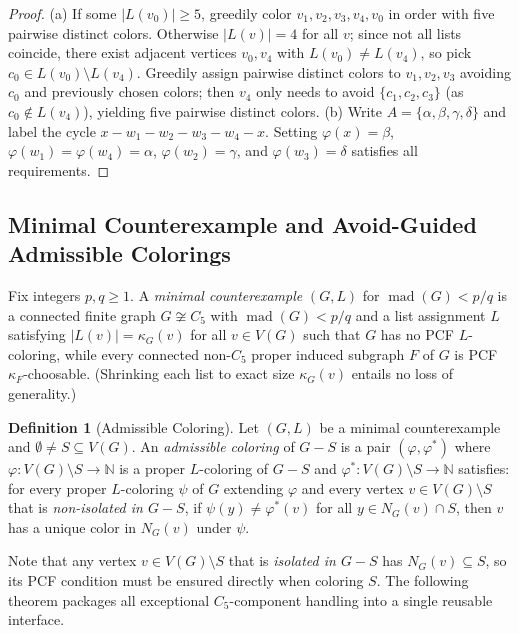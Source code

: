 \documentclass[11pt,a4paper]{article}
\theoremstyle{definition}
\newtheorem{definition}[theorem]{Definition}
\newcommand{\mad}{\operatorname{mad}}
\newcommand{\N}{\mathbb{N}}
\begin{document}
\begin{proof}
(a) If some $|L(v_0)| \ge 5$, greedily color $v_1, v_2, v_3, v_4, v_0$ in order with five pairwise distinct colors. Otherwise $|L(v)| = 4$ for all $v$; since not all lists coincide, there exist adjacent vertices $v_0, v_4$ with $L(v_0) \neq L(v_4)$, so pick $c_0 \in L(v_0) \setminus L(v_4)$. Greedily assign pairwise distinct colors to $v_1, v_2, v_3$ avoiding $c_0$ and previously chosen colors; then $v_4$ only needs to avoid $\{c_1, c_2, c_3\}$ (as $c_0 \notin L(v_4)$), yielding five pairwise distinct colors.
(b) Write $A = \{\alpha, \beta, \gamma, \delta\}$ and label the cycle $x - w_1 - w_2 - w_3 - w_4 - x$. Setting $\varphi(x) = \beta$, $\varphi(w_1) = \varphi(w_4) = \alpha$, $\varphi(w_2) = \gamma$, and $\varphi(w_3) = \delta$ satisfies all requirements.
\end{proof}

\subsection{Minimal Counterexample and Avoid-Guided Admissible Colorings}

Fix integers $p, q \ge 1$. A \emph{minimal counterexample} $(G, L)$ for $\mad(G) < p/q$ is a connected finite graph $G \not\cong C_5$ with $\mad(G) < p/q$ and a list assignment $L$ satisfying $|L(v)| = \kappa_G(v)$ for all $v \in V(G)$ such that $G$ has no PCF $L$-coloring, while every connected non-$C_5$ proper induced subgraph $F$ of $G$ is PCF $\kappa_F$-choosable. (Shrinking each list to exact size $\kappa_G(v)$ entails no loss of generality.)

\begin{definition}[Admissible Coloring]\label{def:admissible}
Let $(G, L)$ be a minimal counterexample and $\emptyset \neq S \subseteq V(G)$. An \emph{admissible coloring} of $G - S$ is a pair $(\varphi, \varphi^*)$ where $\varphi : V(G) \setminus S \to \N$ is a proper $L$-coloring of $G - S$ and $\varphi^* : V(G) \setminus S \to \N$ satisfies: for every proper $L$-coloring $\psi$ of $G$ extending $\varphi$ and every vertex $v \in V(G) \setminus S$ that is \emph{non-isolated in $G - S$}, if $\psi(y) \neq \varphi^*(v)$ for all $y \in N_G(v) \cap S$, then $v$ has a unique color in $N_G(v)$ under $\psi$.
\end{definition}

Note that any vertex $v \in V(G) \setminus S$ that is \emph{isolated in $G - S$} has $N_G(v) \subseteq S$, so its PCF condition must be ensured directly when coloring $S$. The following theorem packages all exceptional $C_5$-component handling into a single reusable interface.
\end{document}
